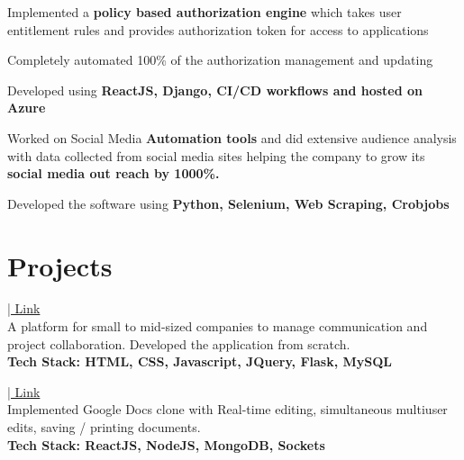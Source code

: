 \documentclass[]{ishaan-kamra-resume}
\begin{document}
\begin{minipage}[t]{0.66\textwidth}
    \begin{tightemize}
        \item Implemented a \textbf{policy based authorization engine} which takes user entitlement rules and provides authorization token for access to applications
        \item Completely automated 100\% of the authorization management and updating
        \item Developed using \textbf{ReactJS, Django, CI/CD workflows and hosted on Azure}
    \end{tightemize}
    \sectionsep

    \begin{tightemize}
        \item Worked on Social Media \textbf{Automation tools} and did extensive audience analysis with data collected from social media sites helping the company to grow its \textbf{social media out reach by 1000\%.}
        \item Developed the software using \textbf{Python, Selenium, Web Scraping, Crobjobs}
    \end{tightemize}
    \sectionsep


    \section{Projects}
    \href{https://github.com/ishaan1091/employee-management-system}{| Link} \\
    A platform for small to mid-sized companies to manage communication and project collaboration. Developed the application from scratch. \\
    \textbf{Tech Stack: HTML, CSS, Javascript, JQuery, Flask, MySQL}
    \sectionsep

    \href{https://github.com/ishaan1091/google-docs-clone}{| Link} \\
    Implemented Google Docs clone with Real-time editing, simultaneous multiuser edits, saving / printing documents. \\
    \textbf{Tech Stack: ReactJS, NodeJS, MongoDB, Sockets}
    \sectionsep


\end{minipage}
\end{document}
